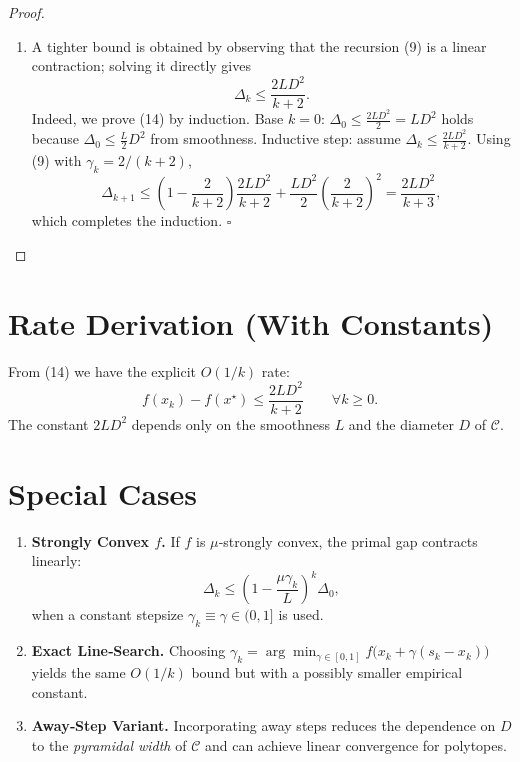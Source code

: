 \documentclass{article}
\begin{document}
\begin{proof}
\begin{enumerate}
\item[Step 11.] A tighter bound is obtained by observing that the recursion (9) is a linear contraction; solving it directly gives
\[
\Delta_{k}\le \frac{2 L D^{2}}{k+2}. \tag{14}
\]
Indeed, we prove (14) by induction.  
Base $k=0$: $\Delta_0\le \frac{2LD^{2}}{2}=LD^{2}$ holds because $\Delta_0\le \frac{L}{2}D^{2}$ from smoothness.  
Inductive step: assume $\Delta_k\le \frac{2LD^{2}}{k+2}$. Using (9) with $\gamma_k=2/(k+2)$,
\[
\Delta_{k+1}\le\left(1-\frac{2}{k+2}\right)\frac{2LD^{2}}{k+2}
               +\frac{LD^{2}}{2}\left(\frac{2}{k+2}\right)^{2}
            =\frac{2LD^{2}}{k+3},
\]
which completes the induction. \hfill $\square$ \qedhere
\end{enumerate}
\end{proof}

\section*{Rate Derivation (With Constants)}
From (14) we have the explicit $O(1/k)$ rate:
\[
f(x_k)-f(x^\star)\le \frac{2 L D^{2}}{k+2}\qquad\forall k\ge0.
\]
The constant $2LD^{2}$ depends only on the smoothness $L$ and the diameter $D$ of $\mathcal{C}$.

\section*{Special Cases}
\begin{enumerate}
\item \textbf{Strongly Convex $f$.} If $f$ is $\mu$‑strongly convex, the primal gap contracts linearly:
\[
\Delta_{k}\le\left(1-\frac{\mu\gamma_k}{L}\right)^{k}\Delta_0,
\]
when a constant stepsize $\gamma_k\equiv\gamma\in(0,1]$ is used.
\item \textbf{Exact Line‑Search.} Choosing $\gamma_k=\arg\min_{\gamma\in[0,1]}f\bigl(x_k+\gamma(s_k-x_k)\bigr)$ yields the same $O(1/k)$ bound but with a possibly smaller empirical constant.
\item \textbf{Away‑Step Variant.} Incorporating away steps reduces the dependence on $D$ to the \emph{pyramidal width} of $\mathcal{C}$ and can achieve linear convergence for polytopes.
\end{enumerate}
\end{document}
